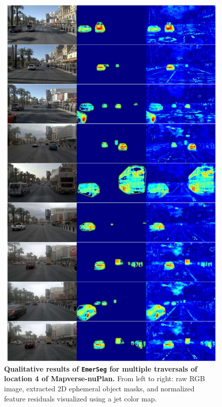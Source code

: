 \begin{figure}[ht]
    \centering
    \includegraphics[width=0.88\linewidth]{figs_compressed/EmerSeg-loc4_compressed.pdf}
    \caption{\textbf{Qualitative results of \texttt{EmerSeg} for multiple traversals of location 4 of Mapverse-nuPlan.} From left to right: raw RGB image, extracted 2D ephemeral object masks, and normalized feature residuals visualized using a jet color map.}
    \label{fig:vegas-loc4}
\end{figure}

